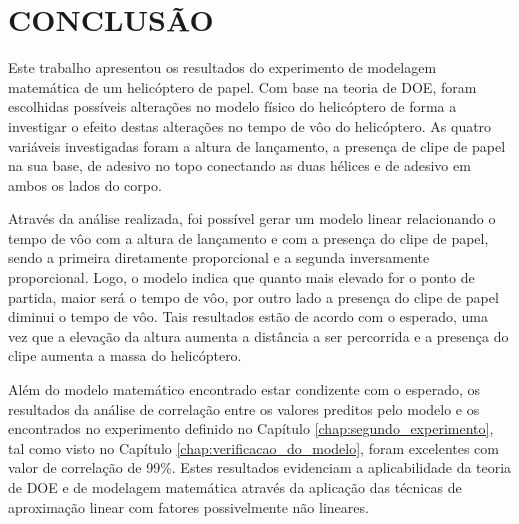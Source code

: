 \chapter{CONCLUSÃO}
\label{chap:conclusao}

Este trabalho apresentou os resultados do experimento de modelagem matemática de um helicóptero de papel. Com base na teoria de \ac{DOE}, foram escolhidas possíveis alterações no modelo físico do helicóptero de forma a investigar o efeito destas alterações no tempo de vôo do helicóptero. As quatro variáveis investigadas foram a altura de lançamento, a presença de clipe de papel na sua base, de adesivo no topo conectando as duas hélices e de adesivo em ambos os lados do corpo.

Através da análise realizada, foi possível gerar um modelo linear relacionando o tempo de vôo com a altura de lançamento e com a presença do clipe de papel, sendo a primeira diretamente proporcional e a segunda inversamente proporcional. Logo, o modelo indica que quanto mais elevado for o ponto de partida, maior será o tempo de vôo, por outro lado a presença do clipe de papel diminui o tempo de vôo. Tais resultados estão de acordo com o esperado, uma vez que a elevação da altura aumenta a distância a ser percorrida e a presença do clipe aumenta a massa do helicóptero.

Além do modelo matemático encontrado estar condizente com o esperado, os resultados da análise de correlação entre os valores preditos pelo modelo e os encontrados no experimento definido no Capítulo \ref{chap:segundo_experimento}, tal como visto no Capítulo \ref{chap:verificacao_do_modelo}, foram excelentes com valor de correlação de 99\%. Estes resultados evidenciam a aplicabilidade da teoria de \ac{DOE} e de modelagem matemática através da aplicação das técnicas de aproximação linear com fatores possivelmente não lineares.